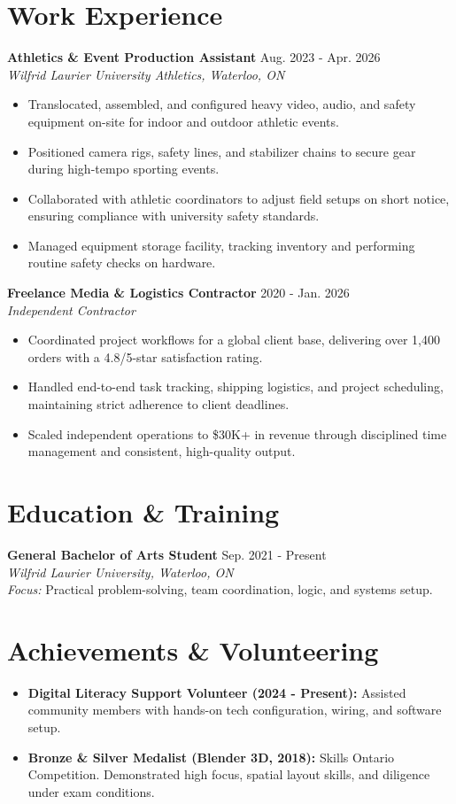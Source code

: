 \documentclass[a4paper,10pt]{article}
\begin{document}
\section*{Work Experience}
\textbf{Athletics & Event Production Assistant} \hfill Aug. 2023 - Apr. 2026 \\
\textit{Wilfrid Laurier University Athletics, Waterloo, ON}
\begin{itemize}
    \item Translocated, assembled, and configured heavy video, audio, and safety equipment on-site for indoor and outdoor athletic events.
    \item Positioned camera rigs, safety lines, and stabilizer chains to secure gear during high-tempo sporting events.
    \item Collaborated with athletic coordinators to adjust field setups on short notice, ensuring compliance with university safety standards.
    \item Managed equipment storage facility, tracking inventory and performing routine safety checks on hardware.
\end{itemize}

\vspace{3pt}
\textbf{Freelance Media & Logistics Contractor} \hfill 2020 - Jan. 2026 \\
\textit{Independent Contractor}
\begin{itemize}
    \item Coordinated project workflows for a global client base, delivering over 1,400 orders with a 4.8/5-star satisfaction rating.
    \item Handled end-to-end task tracking, shipping logistics, and project scheduling, maintaining strict adherence to client deadlines.
    \item Scaled independent operations to \$30K+ in revenue through disciplined time management and consistent, high-quality output.
\end{itemize}

\section*{Education & Training}
\textbf{General Bachelor of Arts Student} \hfill Sep. 2021 - Present \\
\textit{Wilfrid Laurier University, Waterloo, ON} \\
\textit{Focus:} Practical problem-solving, team coordination, logic, and systems setup.

\section*{Achievements \& Volunteering}
\begin{itemize}
    \item \textbf{Digital Literacy Support Volunteer (2024 - Present):} Assisted community members with hands-on tech configuration, wiring, and software setup.
    \item \textbf{Bronze \& Silver Medalist (Blender 3D, 2018):} Skills Ontario Competition. Demonstrated high focus, spatial layout skills, and diligence under exam conditions.
\end{itemize}
\end{document}
